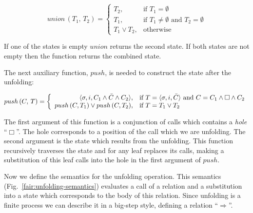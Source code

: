 \[
union\,(T_1,\, T_2) =
\left\{
\begin{array}{rl}
T_2, & \mbox{if } T_1 = \emptyset \\
T_1, & \mbox{if } T_1 \not= \emptyset \mbox{ and } T_2 = \emptyset \\
T_1 \lor T_2, & \mbox{otherwise}
\end{array}
\right.
\]


If one of the states is empty $union$ returns the second state. If both states are not empty then the function returns the combined state.

The next auxiliary function, $push$, is needed to construct the state after the unfolding:

\[
push\,(C,\, T) =
\left\{
\begin{array}{rl}
\langle \sigma, i, C_1 \land \bar{C} \land C_2 \rangle, & \mbox{if } T = \langle \sigma, i, \bar{C} \rangle \mbox{ and } C = C_1 \land \Box \land C_2 \\
push\,(C, T_1) \lor push\,(C, T_2), & \mbox{if } T = T_1 \lor T_2
\end{array}
\right.
\]


The first argument of this function is a conjunction of calls which contains a \emph{hole} ``$\Box$''. The hole corresponds to a position of the call which we are unfolding. 
The second argument is the state which results from the unfolding. This function recursively traverses the state and for any leaf replaces its calls, making a substitution of
this leaf calls into the hole in the first argument of $push$.

Now we define the semantics for the unfolding operation. This semantics (Fig.~\ref{fair:unfolding-semantics}) evaluates a call of a relation and a substitution into a state which
corresponds to the body of this relation. Since unfolding is a finite process we can describe it in a big-step style, defining a relation ``$\Rightarrow$''.

